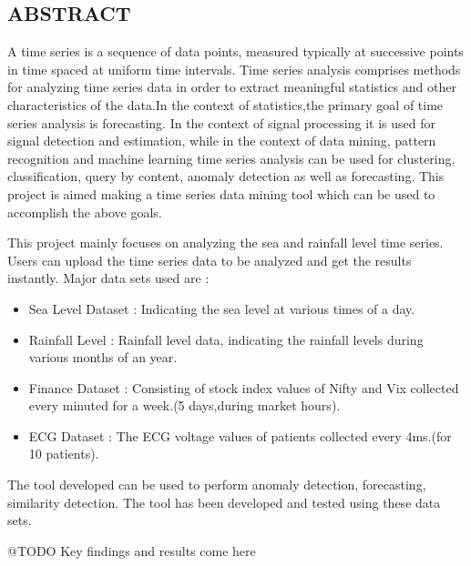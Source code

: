\documentclass[12pt]{report}
\begin{document}
\newpage

\begin{center}
\section*{ABSTRACT}
\end{center} 
A time series is a sequence of data points, measured typically at successive points in time spaced at uniform time intervals. Time series analysis comprises methods for analyzing time series data in order to extract meaningful statistics and other characteristics of the data.In the context of statistics,the primary goal of time series analysis is forecasting. In the context of signal processing it is used for signal detection and estimation, while in the context of data mining, pattern recognition and machine learning time series analysis can be used for clustering, classification, query by content, anomaly detection as well as forecasting. This project is aimed making a time series data mining tool which can be used to accomplish the above goals. 




This project mainly focuses on analyzing the sea and rainfall level time series. Users can upload the time series data to be analyzed and get the results instantly. Major data sets used are :
\begin{itemize}
\item Sea Level Dataset : Indicating the sea level at various times of a day.
\item Rainfall Level : Rainfall level data, indicating the rainfall levels during various months of an year.
\item Finance Dataset : Consisting of stock index values of  Nifty and Vix collected every minuted for a week.(5 days,during market hours).
\item ECG Dataset : The ECG  voltage values of patients collected every 4ms.(for 10 patients).
\end{itemize}

The tool developed can be used to perform anomaly detection, forecasting, similarity detection. The tool has been developed and tested using these data sets.



@TODO Key findings and results come here
\end{document}
